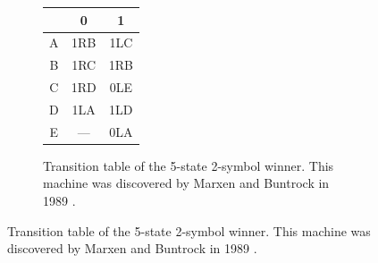\documentclass[a4paper,british]{article}
\theoremstyle{definition} %
\numberwithin{equation}{section}
\theoremstyle{definition} %
\newcommand{\stateA}{{\textcolor{colorA}{A}}\xspace}
\newcommand{\stateB}{{\textcolor{colorB}{B}}\xspace}
\newcommand{\stateC}{{\textcolor{colorC}{C}}\xspace}
\newcommand{\stateD}{{\textcolor{colorD}{D}}\xspace}
\newcommand{\stateE}{{\textcolor{colorE}{E}}\xspace}
\begin{document}
\begin{figure}[h!]
    \centering
    \begin{subfigure}[t]{0.45\textwidth}
        \centering
        \renewcommand{\arraystretch}{1.3} %
        \setlength{\tabcolsep}{12pt} %
        \vspace{10pt} %
        \begin{tabular}{ccc}
            \toprule
                    & \textbf{0} & \textbf{1} \\
            \midrule
            \stateA & 1R\stateB  & 1L\stateC  \\
            \stateB & 1R\stateC  & 1R\stateB  \\
            \stateC & 1R\stateD  & 0L\stateE  \\
            \stateD & 1L\stateA  & 1L\stateD  \\
            \stateE & ---        & 0L\stateA  \\
            \bottomrule
        \end{tabular}
        \caption{Transition table of the 5-state 2-symbol \BBfull winner. This machine was discovered by Marxen and Buntrock in 1989 \cite{Marxen_1990}.}
        \label{table:bb5}


\end{subfigure}
\end{figure}
\end{document}
